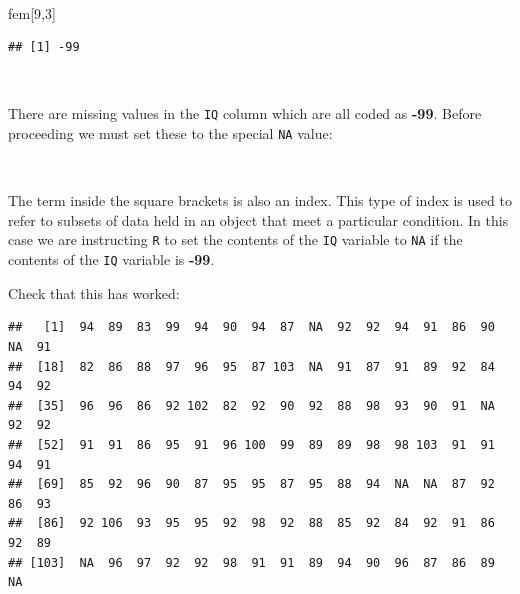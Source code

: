 \documentclass[12pt,a4paper]{book}
\newenvironment{Shaded}{\begin{snugshade}}{\end{snugshade}}
\newcommand{\DecValTok}[1]{\textcolor[rgb]{0.00,0.00,0.81}{#1}}
\newcommand{\StringTok}[1]{\textcolor[rgb]{0.31,0.60,0.02}{#1}}
\newcommand{\OtherTok}[1]{\textcolor[rgb]{0.56,0.35,0.01}{#1}}
\newcommand{\OperatorTok}[1]{\textcolor[rgb]{0.81,0.36,0.00}{\textbf{#1}}}
\newcommand{\NormalTok}[1]{#1}
\theoremstyle{definition}
\theoremstyle{definition}
\theoremstyle{definition}
\theoremstyle{remark}
\begin{document}
~

\begin{Shaded}
\begin{Highlighting}[]
\NormalTok{fem[}\DecValTok{9}\NormalTok{,}\DecValTok{3}\NormalTok{]}
\end{Highlighting}
\end{Shaded}

\begin{verbatim}
## [1] -99
\end{verbatim}

~

There are missing values in the \texttt{IQ} column which are all coded
as \textbf{-99}. Before proceeding we must set these to the special
\texttt{NA} value:

\begin{Shaded}
\end{Shaded}

~

The term inside the square brackets is also an index. This type of index
is used to refer to subsets of data held in an object that meet a
particular condition. In this case we are instructing \texttt{R} to set
the contents of the \texttt{IQ} variable to \texttt{NA} if the contents
of the \texttt{IQ} variable is \textbf{-99}.

Check that this has worked:

\begin{Shaded}
\end{Shaded}

\begin{verbatim}
##   [1]  94  89  83  99  94  90  94  87  NA  92  92  94  91  86  90  NA  91
##  [18]  82  86  88  97  96  95  87 103  NA  91  87  91  89  92  84  94  92
##  [35]  96  96  86  92 102  82  92  90  92  88  98  93  90  91  NA  92  92
##  [52]  91  91  86  95  91  96 100  99  89  89  98  98 103  91  91  94  91
##  [69]  85  92  96  90  87  95  95  87  95  88  94  NA  NA  87  92  86  93
##  [86]  92 106  93  95  95  92  98  92  88  85  92  84  92  91  86  92  89
## [103]  NA  96  97  92  92  98  91  91  89  94  90  96  87  86  89  NA
\end{verbatim}
\end{document}

